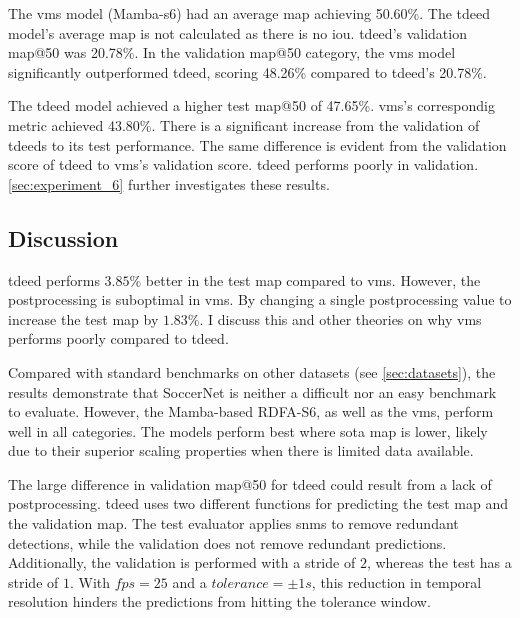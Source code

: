 The \acrshort{vms} model (Mamba-\acrshort{s6}) had an average \acrshort{map} achieving 50.60\%. The \acrshort{tdeed} model's average \acrshort{map} is not calculated as there is no \acrshort{iou}. \acrshort{tdeed}'s validation \acrshort{map}@50 was 20.78\%. In the validation \acrshort{map}@50 category, the \acrshort{vms} model significantly outperformed \acrshort{tdeed}, scoring 48.26\% compared to \acrshort{tdeed}'s 20.78\%.

The \acrshort{tdeed} model achieved a higher test \acrshort{map}@50 of 47.65\%. \acrshort{vms}'s correspondig metric achieved 43.80\%. There is a significant increase from the validation of \acrshort{tdeed}s to its test performance. The same difference is evident from the validation score of \acrshort{tdeed} to \acrshort{vms}'s validation score. \acrshort{tdeed} performs poorly in validation. \cref{sec:experiment_6} further investigates these results.

\subsection{Discussion}
\label{ssec:ex1_discussion}

\acrshort{tdeed} performs $3.85\%$ better in the test \acrshort{map} compared to \acrshort{vms}. However, the postprocessing is suboptimal in \acrshort{vms}. By changing a single postprocessing value to increase the test \acrshort{map} by $1.83\%$. I discuss this and other theories on why \acrshort{vms} performs poorly compared to \acrshort{tdeed}. 

Compared with standard benchmarks on other datasets (see \cref{sec:datasets}), the results demonstrate that SoccerNet is neither a difficult nor an easy benchmark to evaluate. However, the Mamba-based RDFA-S6, as well as the \acrshort{vms}, perform well in all categories. The models perform best where \acrlong{sota} \acrshort{map} is lower, likely due to their superior scaling properties when there is limited data available. 

The large difference in validation \acrshort{map}@50 for \acrshort{tdeed} could result from a lack of postprocessing. \acrshort{tdeed} uses two different functions for predicting the test \acrshort{map} and the validation \acrshort{map}. The test evaluator applies \acrfull{snms} to remove redundant detections, while the validation does not remove redundant predictions. Additionally, the validation is performed with a stride of \(2\), whereas the test has a stride of \(1\). With \(fps=25\) and a \(tolerance = \pm1s\), this reduction in temporal resolution hinders the predictions from hitting the tolerance window. 

